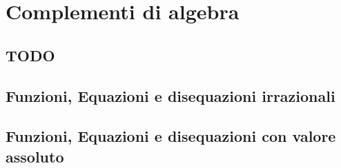 
\chapter{Complementi di algebra}

\section{TODO}

\section{Funzioni, Equazioni e disequazioni irrazionali}
\label{sec:01_irrazionali}

% 

\section{Funzioni, Equazioni e disequazioni con valore assoluto}
\label{sec:02_valass}

